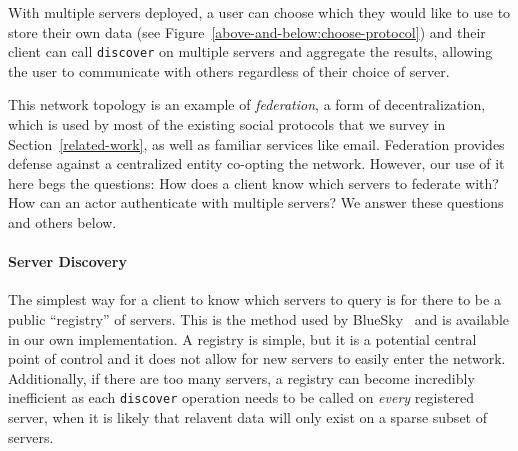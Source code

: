 With multiple servers deployed,
a user can choose which they would like to use to store their own data
(see Figure~\ref{above-and-below:choose-protocol})
and their client can call \texttt{discover} on
multiple servers and aggregate the results,
allowing the user to communicate with others regardless
of their choice of server.

This network topology is an example of \emph{federation},
a form of decentralization, which is used by most of the
existing social protocols that we survey in Section~\ref{related-work},
as well as familiar services like email.
Federation provides defense against a centralized entity
co-opting the network.
However, our use of it here begs the questions:
How does a client know which servers to federate with?
How can an actor authenticate with multiple servers?
We answer these questions and others below.


\paragraph{Server Discovery}

The simplest way for a client to know which
servers to query is for there to
be a public ``registry'' of servers.
This is the method used by BlueSky~\cite{bluesky}
and is available in our
own implementation.
A registry is simple, but it is a potential central point of control
and it does not allow for new
servers to easily enter the network.
Additionally, if there are too many servers, a registry can become
incredibly inefficient as each \texttt{discover} operation needs to be called
on \emph{every} registered server, when it is likely that relavent data
will only exist on a sparse subset of servers.

